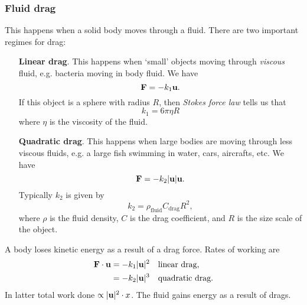 \subsubsection*{Fluid drag}
This happens when a solid body moves through a fluid. There are two important regimes for drag:
\begin{enumerate}[align=left]
    \item[\textbf{Linear drag}.] This happens when `small' objects moving through \textit{viscous} fluid, e.g. bacteria moving in body fluid. We have 
    \[
        \mathbf{F} = -k_1{\bf u}.
    \]
    If this object is a sphere with radius $R$, then \textit{Stokes force law} tells us that
    \[
        k_1 = 6\pi \eta R
    \]
    where $\eta$ is the viscosity of the fluid.
    \item[\textbf{Quadratic drag}.] This happens when large bodies are moving through less viscous fluids, e.g. a large fish swimming in water, cars, aircrafts, etc. We have 
    \[
        \mathbf{F} = -k_2 |{\bf u}|{\bf u}.
    \]
    Typically $k_2$ is given by 
    \[
        k_2 = \rho_{\text{fluid}}C_{\text{drag}}R^2,
    \]
    where $ \rho $ is the fluid density, $C$ is the drag coefficient, and $R$ is the size scale of the object.
\end{enumerate}

A body loses kinetic energy as a result of a drag force. Rates of working are 
\begin{align*}
    {\bf F}\cdot{\bf u} &= -k_1|{\bf u}|^2\quad \text{linear drag,}\\
    &= -k_2|{\bf u}|^3\quad \text{quadratic drag.} 
\end{align*}
In latter total work done $ \propto |{\bf u}|^2\cdot x $. The fluid gains energy as a result of drags.

